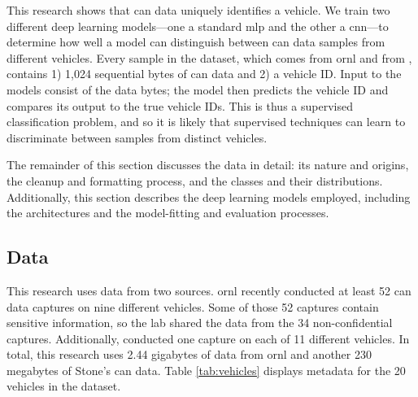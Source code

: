 \documentclass[../main.tex]{subfiles}
\begin{document}

This research shows that \ac{can} data uniquely identifies a vehicle. We train two different deep learning models---one a standard \ac{mlp} and the other a \ac{cnn}---to determine how well a model can distinguish between \ac{can} data samples from different vehicles. Every sample in the dataset, which comes from \ac{ornl} and from \cite{Stone2018}, contains 1) 1,024 sequential bytes of \ac{can} data and 2) a vehicle ID. Input to the models consist of the data bytes; the model then predicts the vehicle ID and compares its output to the true vehicle IDs. This is thus a supervised classification problem, and so it is likely that supervised techniques can learn to discriminate between samples from distinct vehicles.


The remainder of this section discusses the data in detail: its nature and origins, the cleanup and formatting process, and the classes and their distributions. Additionally, this section describes the deep learning models employed, including the architectures and the model-fitting and evaluation processes. 

\subsection{Data}\label{methodology:data}


This research uses data from two sources. \acl{ornl} recently conducted at least 52 \ac{can} data captures on nine different vehicles. Some of those 52 captures contain sensitive information, so the lab shared the data from the 34 non-confidential captures. Additionally, \cite{Stone2018} conducted one capture on each of 11 different vehicles. In total, this research uses 2.44 gigabytes of data from \ac{ornl} and another 230 megabytes of Stone's \ac{can} data. Table \ref{tab:vehicles} displays metadata for the 20 vehicles in the dataset.
\end{document}
